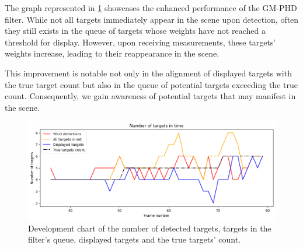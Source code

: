 The graph represented in \ref{gr:E1-V1-S1} showcases the enhanced performance of the GM-PHD filter. While not all
targets immediately appear in the scene upon detection, often they still exists in the queue of targets whose weights
have
not reached a threshold for display. However, upon receiving measurements, these targets' weights increase, leading to their reappearance in the scene.

This improvement is notable not only in the alignment of displayed targets with the true target count but also in the queue of potential targets exceeding the true count. Consequently, we gain awareness of potential targets that may manifest in the scene.


\begin{figure}[H]
    \centering
    \includegraphics[width=\linewidth]{../../../experiments/E1/V1/YOLO/yolo_det}
    \caption{Development chart of the number of detected targets, targets in the filter's queue, displayed targets and
    the true
    targets' count.}
    \label{gr:E1-V1-S1}
\end{figure}

